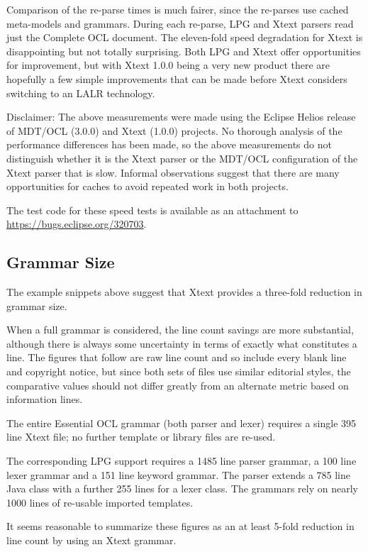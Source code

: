 \documentclass[runningheads,a4paper]{llncs}
\begin{document}
Comparison of the re-parse times is much fairer, since the re-parses use cached meta-models and grammars. During each re-parse, LPG and Xtext parsers read just the Complete OCL document. The eleven-fold speed degradation for Xtext is disappointing but not totally surprising. Both LPG and Xtext offer opportunities for improvement, but with Xtext 1.0.0 being a very new product there are hopefully a few simple improvements that can be made before Xtext considers switching to an LALR technology.

Disclaimer: The above measurements were made using the Eclipse Helios release of MDT/OCL (3.0.0) and Xtext (1.0.0) projects. No thorough analysis of the performance differences has been made, so the above measurements do not distinguish whether it is the Xtext parser or the MDT/OCL configuration of the Xtext parser that is slow. Informal observations suggest that there are many opportunities for caches to avoid repeated work in both projects.

The test code for these speed tests is available as an attachment to \url{https://bugs.eclipse.org/320703}.

\subsection{Grammar Size}

The example snippets above suggest that Xtext provides a three-fold reduction in grammar size.

When a full grammar is considered, the line count savings are more substantial, although there is always some uncertainty in terms of exactly what constitutes a line. The figures that follow are raw line count and so include every blank line and copyright notice, but since both sets of files use similar editorial styles, the comparative values should not differ greatly from an alternate metric based on information lines.

The entire Essential OCL grammar (both parser and lexer) requires a single 395 line Xtext file; no further template or library files are re-used.

The corresponding LPG support requires a 1485 line parser grammar, a 100 line lexer grammar and a 151 line keyword grammar. The parser extends a 785 line Java class with a further 255 lines for a lexer class. The grammars rely on nearly 1000 lines of re-usable imported templates.

It seems reasonable to summarize these figures as an at least 5-fold reduction in line count by using an Xtext grammar.
\end{document}
